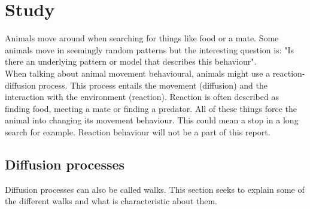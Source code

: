 \chapter{Study}
Animals move around when searching for things like food or a mate. Some animals move in seemingly random patterns but the interesting question is: "Is there an underlying pattern or model that describes this behaviour".\\
When talking about animal movement behavioural, animals might use a reaction-diffusion process. 
This process entails the movement (diffusion) and the interaction with the environment (reaction). 
Reaction is often described as finding food, meeting a mate or finding a predator. 
All of these things force the animal into changing its movement behaviour. This could mean a stop in a long search for example. 
Reaction behaviour will not be a part of this report.

\section{Diffusion processes}
Diffusion processes can also be called walks. This section seeks to explain some of the different walks and what is characteristic about them.

